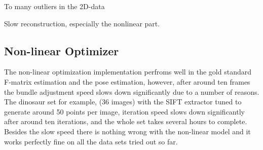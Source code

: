 To many outliers in the 2D-data

Slow reconstruction, especially the nonlinear part.


\subsection{Non-linear Optimizer}
The non-linear optimization implementation perfroms well in the gold standard F-matrix estimation and the pose estimation, however, after around ten frames the bundle adjustment speed slows down significantly due to a number of reasons. The dinosaur set for example, (36 images) with the SIFT extractor tuned to generate around 50 points per image, iteration speed slows down significantly after around ten iterations, and the whole set takes several hours to complete. Besides the slow speed there is nothing wrong with the non-linear model and it works perfectly fine on all the data sets tried out so far.